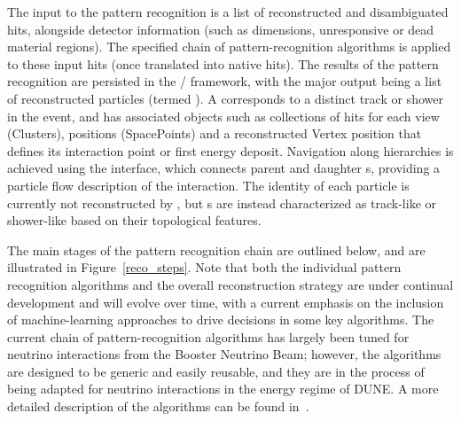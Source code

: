 The input to the  pattern recognition is a list of reconstructed and disambiguated \twod hits, alongside detector information (such as dimensions, unresponsive or dead material regions). The specified chain of pattern-recognition algorithms is applied to these input hits (once translated into native  \twod hits). The results of the pattern recognition are persisted in the / framework, with the major output being a list of reconstructed \threed particles (termed ). A  corresponds to a distinct track or shower in the event, and has associated objects such as collections of \twod hits for each view (Clusters), \threed positions (SpacePoints) and a reconstructed Vertex position that defines its interaction point or first energy deposit. Navigation along  hierarchies is achieved using the  interface, which connects parent and daughter s, providing a particle flow description of the interaction. The identity of each particle is currently not reconstructed by , but s are instead characterized as track-like or shower-like based on their topological features. 

The main stages of the  pattern recognition chain are outlined below, and are illustrated in Figure~\ref{reco_steps}. Note that both the individual pattern recognition algorithms and the overall reconstruction strategy are under continual development and will evolve over time, with a current emphasis %
on the inclusion of machine-learning approaches to drive decisions in some key algorithms. The current chain of pattern-recognition algorithms has largely been tuned for neutrino interactions from the \fnal Booster Neutrino Beam; however, the algorithms are designed to be generic and easily reusable, and they are in the process of being adapted for neutrino interactions in the energy regime of DUNE. A more detailed description of the algorithms can be found in~\cite{Acciarri:2017hat}. 


